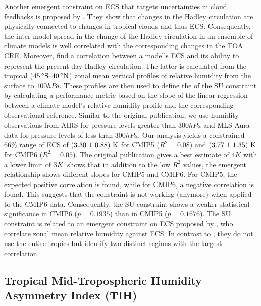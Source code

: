 Another emergent constraint on \ac{ECS} that targets uncertainties in cloud
feedbacks is proposed by \textcite{Su2014}. They show that changes in the
Hadley circulation are physically connected to changes in tropical clouds and
thus \ac{ECS}. Consequently, the inter-model spread in the change of the Hadley
circulation in an ensemble of climate models is well correlated with the
corresponding changes in the \ac{TOA} \ac{CRE}. Moreover, \textcite{Su2014}
find a correlation between a model's \ac{ECS} and its ability to represent the
present-day Hadley circulation. The latter is calculated from the tropical
($\range{45 \unit{\degree S}}{40 \unit{\degree N}}$) zonal mean vertical
profiles of relative humidity from the surface to $100 \unit{hPa}$. These
profiles are then used to define the \xaxis{} of the SU constraint by
calculating a performance metric based on the slope of the linear regression
between a climate model's relative humidity profile and the corresponding
observational reference. Similar to the original publication, we use humidity
observations from AIRS \autocite{Aumann2003} for pressure levels greater than
$300 \unit{hPa}$ and MLS-Aura data \autocite{Beer2006} for pressure levels of
less than $300 \unit{hPa}$. Our analysis yields a constrained $66 \unit{\%}$
range of \ac{ECS} of $\pmrangeunit{3.30}{0.88}{K}$ for \acs{CMIP}5 ($R^2 =
0.08$) and $\pmrangeunit{3.77}{1.35}{K}$ for \acs{CMIP}6 ($R^2 = 0.05$). The
original publication gives a best estimate of $4 \unit{K}$ with a lower limit
of $3 \unit{K}$.  shows that in addition to the low
$R^2$ values, the emergent relationship shows different slopes for \acs{CMIP}5
and \acs{CMIP}6. For \acs{CMIP}5, the expected positive correlation is found,
while for \acs{CMIP}6, a negative correlation is found. This suggests that the
constraint is not working (anymore) when applied to the \acs{CMIP}6 data.
Consequently, the SU constraint shows a weaker statistical significance in
\acs{CMIP}6 ($p = 0.1935$) than in \acs{CMIP}5 ($p = 0.1676$). The SU
constraint is related to an emergent constraint on \ac{ECS} proposed by
\textcite{Fasullo2012}, who correlate  zonal mean relative
humidity against \ac{ECS}. In contrast to \textcite{Su2014}, they do not use
the entire tropics but identify two distinct regions with the largest
correlation.


\subsection{Tropical Mid-Tropospheric Humidity Asymmetry Index (TIH)}
\label{subsec:05:tih}

